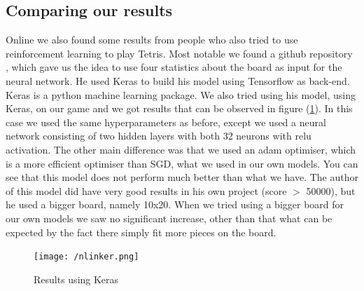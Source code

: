 \documentclass{report}
\begin{document}
\subsection{Comparing our results}
Online we also found some results from people who also tried to use reinforcement learning to play Tetris. Most notable we found a github repository \cite{nlinker}, which gave us the idea to use four statistics about the board as input for the neural network. He used Keras to build his model using Tensorflow as back-end. Keras is a python machine learning package. We also tried using his model, using Keras, on our game and we got results that can be observed in figure (\ref{fig:nlinker}). In this case we used the same hyperparameters as before, except we used a neural network consisting of two hidden layers with both 32 neurons with relu activation. The other main difference was that we used an adam optimiser, which is a more efficient optimiser than SGD, what we used in our own models. You can see that this model does not perform much better than what we have. The author of this model did have very good results in his own project (score $>$ 50000), but he used a bigger board, namely 10x20. When we tried using a bigger board for our own models we saw no significant increase, other than that what can be expected by the fact there simply fit more pieces on the board.
\begin{figure}[h]
	\centering
	\begin{minipage}[b]{0.45\textwidth}
   		\texttt{[image: /nlinker.png]}
    	\caption{Results using Keras}
    	\label{fig:nlinker}
 	\end{minipage}
\end{figure}
\end{document}
